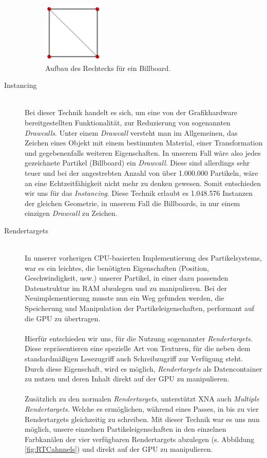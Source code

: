 \begin{Spacing}{\mylinespace}
\begin{description}
\begin{figure}[h!]
	\centering
	\vspace*{30px}
	\includegraphics[width=110px]{graphics/billboardQuad.png}
	\caption{Aufbau des Rechtecks für ein Billboard.}
	\label{fig:BBQuad}
\end{figure}
\newpage
	\item[Instancing] \hfill \\
	Bei dieser Technik handelt es sich, um eine von der Grafikhardware bereitgestellten Funktionalität, zur Reduzierung von sogenannten \textit{Drawcalls}. Unter einem \textit{Drawcall} versteht man im Allgemeinen, das Zeichen eines Objekt mit einem bestimmten Material, einer Transformation und gegebenenfalls weiteren Eigenschaften. In unserem Fall wäre also jedes gezeichnete Partikel (Billboard) ein \textit{Drawcall}. Diese sind allerdings sehr teuer und bei der angestrebten Anzahl von über 1.000.000 Partikeln, wäre an eine Echtzeitfähigkeit nicht mehr zu denken gewesen. Somit entschieden wir uns für das \textit{Instancing}. Diese Technik erlaubt es 1.048.576 Instanzen der gleichen Geometrie, in unserem Fall die Billboards, in nur einem einzigen \textit{Drawcall} zu Zeichen. 
	
	\item[Rendertargets] \hfill \\
	In unserer vorherigen CPU-basierten Implementierung des Partikelsystems, war es ein leichtes, die benötigten Eigenschaften (Position, Geschwindigkeit, usw.) unserer Partikel, in einer dazu passenden Datenstruktur im RAM abzulegen und zu manipulieren. Bei der Neuimplementierung musste nun ein Weg gefunden werden, die Speicherung und Manipulation der Partikeleigenschaften, performant auf die GPU zu übertragen.
\\\\
Hierfür entschieden wir uns, für die Nutzung sogenannter \textit{Rendertargets}.   Diese repräsentieren eine spezielle Art von Texturen, für die neben dem standardmäßigen Lesezugriff auch Schreibzugriff zur Verfügung steht. Durch diese Eigenschaft, wird es möglich, \textit{Rendertargets} als Datencontainer zu nutzen und deren Inhalt direkt auf der GPU zu manipulieren.
\\\\
Zusätzlich zu den normalen \textit{Rendertargets}, unterstützt XNA auch \textit{Multiple Rendertargets}. Welche es ermöglichen, während eines Passes, in bis zu vier Rendertargets gleichzeitig zu schreiben. Mit dieser Technik war es uns nun möglich, unsere einzelnen Partikeleigenschaften in den einzelnen Farbkanälen der vier verfügbaren Rendertargets abzulegen (s. Abbildung \ref{fig:RTCahnnels}) und direkt auf der GPU zu manipulieren. 
	

\end{description}
\end{Spacing}
